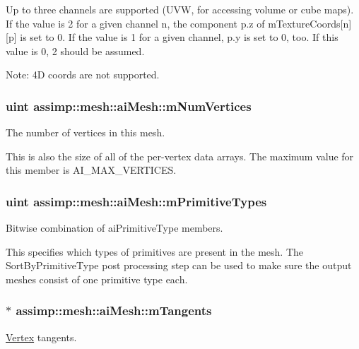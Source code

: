 Up to three channels are supported (U\+V\+W, for accessing volume or cube maps). If the value is 2 for a given channel {\ttfamily n}, the component {\ttfamily p.\+z} of {\ttfamily m\+Texture\+Coords\mbox{[}n\mbox{]}\mbox{[}p\mbox{]}} is set to 0. If the value is 1 for a given channel, {\ttfamily p.\+y} is set to 0, too. If this value is 0, 2 should be assumed.

Note\+: 4\+D coords are not supported. \hypertarget{structassimp_1_1mesh_1_1ai_mesh_a86c33abdd6b7fe4c3a722d5c8c16465a}{
\subsubsection[{m\+Num\+Vertices}]{\setlength{\rightskip}{0pt plus 5cm}uint assimp\+::mesh\+::ai\+Mesh\+::m\+Num\+Vertices}}\label{structassimp_1_1mesh_1_1ai_mesh_a86c33abdd6b7fe4c3a722d5c8c16465a}
The number of vertices in this mesh.

This is also the size of all of the per-\/vertex data arrays. The maximum value for this member is {\ttfamily A\+I\+\_\+\+M\+A\+X\+\_\+\+V\+E\+R\+T\+I\+C\+E\+S}. \hypertarget{structassimp_1_1mesh_1_1ai_mesh_a44f34796ead653c34b9cf15cf2ea3ca4}{
\subsubsection[{m\+Primitive\+Types}]{\setlength{\rightskip}{0pt plus 5cm}uint assimp\+::mesh\+::ai\+Mesh\+::m\+Primitive\+Types}}\label{structassimp_1_1mesh_1_1ai_mesh_a44f34796ead653c34b9cf15cf2ea3ca4}
Bitwise combination of {\ttfamily ai\+Primitive\+Type} members.

This specifies which types of primitives are present in the mesh. The {\ttfamily Sort\+By\+Primitive\+Type} post processing step can be used to make sure the output meshes consist of one primitive type each. \hypertarget{structassimp_1_1mesh_1_1ai_mesh_abd53e75d34cbfc0e3e44768c664def15}{
\subsubsection[{m\+Tangents}]{$\ast$ assimp\+::mesh\+::ai\+Mesh\+::m\+Tangents}}\label{structassimp_1_1mesh_1_1ai_mesh_abd53e75d34cbfc0e3e44768c664def15}
\hyperlink{struct_vertex}{Vertex} tangents.

